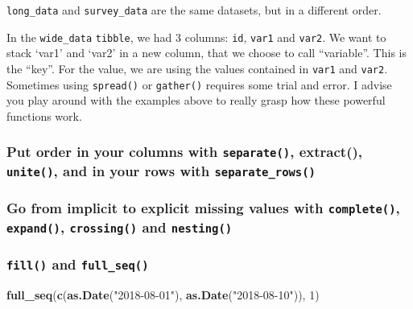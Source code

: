 \documentclass[]{gitbook}
\newenvironment{Shaded}{\begin{snugshade}}{\end{snugshade}}
\newcommand{\DecValTok}[1]{\textcolor[rgb]{0.00,0.00,0.81}{#1}}
\newcommand{\KeywordTok}[1]{\textcolor[rgb]{0.13,0.29,0.53}{\textbf{#1}}}
\newcommand{\NormalTok}[1]{#1}
\newcommand{\StringTok}[1]{\textcolor[rgb]{0.31,0.60,0.02}{#1}}
\theoremstyle{definition}
\theoremstyle{definition}
\theoremstyle{definition}
\theoremstyle{remark}
\begin{document}
\texttt{long\_data} and \texttt{survey\_data} are the same datasets, but
in a different order.

In the \texttt{wide\_data} \texttt{tibble}, we had 3 columns:
\texttt{id}, \texttt{var1} and \texttt{var2}. We want to stack `var1'
and `var2' in a new column, that we choose to call ``variable''. This is
the ``key''. For the value, we are using the values contained in
\texttt{var1} and \texttt{var2}. Sometimes using \texttt{spread()} or
\texttt{gather()} requires some trial and error. I advise you play
around with the examples above to really grasp how these powerful
functions work.

\hypertarget{put-order-in-your-columns-with-separate-extract-unite-and-in-your-rows-with-separate_rows}{%
\subsubsection{\texorpdfstring{Put order in your columns with
\texttt{separate()}, extract(), \texttt{unite()}, and in your rows with
\texttt{separate\_rows()}}{Put order in your columns with separate(), extract(), unite(), and in your rows with separate\_rows()}}\label{put-order-in-your-columns-with-separate-extract-unite-and-in-your-rows-with-separate_rows}}

\hypertarget{go-from-implicit-to-explicit-missing-values-with-complete-expand-crossing-and-nesting}{%
\subsubsection{\texorpdfstring{Go from implicit to explicit missing
values with \texttt{complete()}, \texttt{expand()}, \texttt{crossing()}
and
\texttt{nesting()}}{Go from implicit to explicit missing values with complete(), expand(), crossing() and nesting()}}\label{go-from-implicit-to-explicit-missing-values-with-complete-expand-crossing-and-nesting}}

\hypertarget{fill-and-full_seq}{%
\subsubsection{\texorpdfstring{\texttt{fill()} and
\texttt{full\_seq()}}{fill() and full\_seq()}}\label{fill-and-full_seq}}

\begin{Shaded}
\begin{Highlighting}[]
\KeywordTok{full_seq}\NormalTok{(}\KeywordTok{c}\NormalTok{(}\KeywordTok{as.Date}\NormalTok{(}\StringTok{"2018-08-01"}\NormalTok{), }\KeywordTok{as.Date}\NormalTok{(}\StringTok{"2018-08-10"}\NormalTok{)), }\DecValTok{1}\NormalTok{)}
\end{Highlighting}
\end{Shaded}
\end{document}
